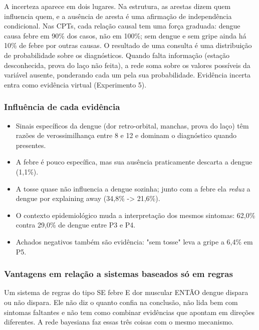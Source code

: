 \documentclass[12pt, a4paper]{article}
\providecommand{\tightlist}{%
  \setlength{\itemsep}{0pt}\setlength{\parskip}{0pt}}
\begin{document}
A incerteza aparece em dois lugares. Na estrutura, as arestas dizem quem influencia quem, e a ausência de aresta é uma afirmação de independência condicional. Nas CPTs, cada relação causal tem uma força graduada: dengue causa febre em 90\% dos casos, não em 100\%; sem dengue e sem gripe ainda há 10\% de febre por outras causas. O resultado de uma consulta é uma distribuição de probabilidade sobre os diagnósticos. Quando falta informação (estação desconhecida, prova do laço não feita), a rede soma sobre os valores possíveis da variável ausente, ponderando cada um pela sua probabilidade. Evidência incerta entra como evidência virtual (Experimento 5).

\subsubsection{Influência de cada evidência}\label{influuxeancia-de-cada-eviduxeancia}

\begin{itemize}
\tightlist
\item
  Sinais específicos da dengue (dor retro-orbital, manchas, prova do laço) têm razões de verossimilhança entre 8 e 12 e dominam o diagnóstico quando presentes.
\item
  A febre é pouco específica, mas sua ausência praticamente descarta a dengue (1,1\%).
\item
  A tosse quase não influencia a dengue sozinha; junto com a febre ela \emph{reduz} a dengue por explaining away (34,8\% -> 21,6\%).
\item
  O contexto epidemiológico muda a interpretação dos mesmos sintomas: 62,0\% contra 29,0\% de dengue entre P3 e P4.
\item
  Achados negativos também são evidência: "sem tosse" leva a gripe a 6,4\% em P5.
\end{itemize}

\subsubsection{Vantagens em relação a sistemas baseados só em regras}\label{vantagens-em-relauxe7uxe3o-a-sistemas-baseados-suxf3-em-regras}

Um sistema de regras do tipo SE febre E dor muscular ENTÃO dengue dispara ou não dispara. Ele não diz o quanto confia na conclusão, não lida bem com sintomas faltantes e não tem como combinar evidências que apontam em direções diferentes. A rede bayesiana faz essas três coisas com o mesmo mecanismo.
\end{document}
